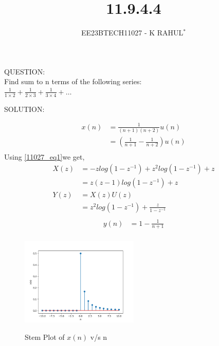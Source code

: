 \documentclass[journal,12pt,twocolumn]{IEEEtran}
\theoremstyle{remark}
\begin{document}

\vspace{3cm}
\title{11.9.4.4}
\author{EE23BTECH11027 - K RAHUL$^{*}$%
}
\maketitle
\newpage
\bigskip
\renewcommand{\thefigure}{\theenumi}
\renewcommand{\thetable}{\theenumi}
QUESTION:\\
Find sum to n terms of the following series:\\
$\frac{1}{1 \times 2} + \frac{1}{2 \times 3} + \frac{1}{3 \times 4} + \ldots$
\bigskip \bigskip


SOLUTION:
\begin{table}[ht]

\end{table}
\begin{align}
x(n) &= \frac{1}{(n+1)(n+2)}u(n)\\
& = (\frac{1}{n+1} - \frac{1}{n+2})u(n)\\
\end{align}
Using \eqref{11027_eq1}we get,
\begin{align}X(z) &= -z log(1-z^{-1}) + z^2 log(1-z^{-1}) + z\\
&= z(z-1)log(1-z^{-1}) + z\\
    Y(z) &= X(z)U(z)\\
     &=z^2log(1-z^{-1}) + \frac{z}{1-z^{-1}} \\
\end{align}
\begin{align}
    y(n) &= 1 - \frac{1}{n+1}\\
\end{align}
\begin{figure}[h]
    \includegraphics[width=0.5\textwidth]{figs/x(n)_plot.png}\label{fig:stem-plot}
    \caption{Stem Plot of $x(n)$ v/s n}
\end{figure}
\end{document}
